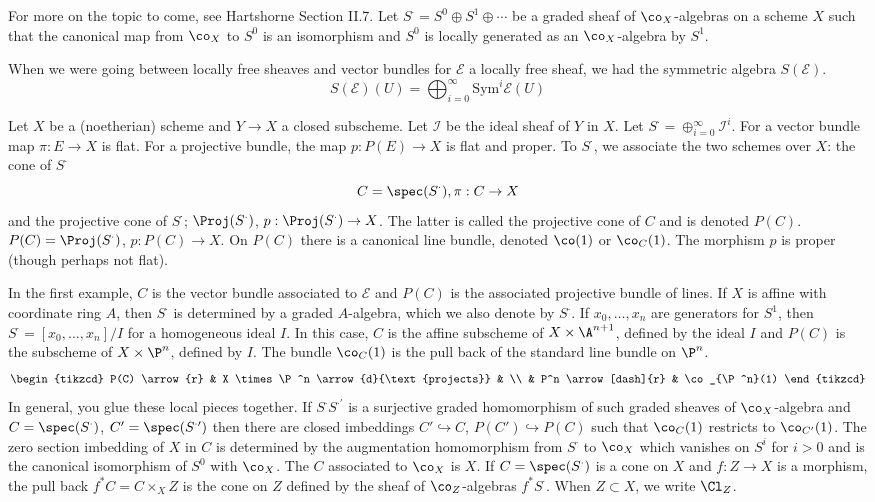 For more on the topic to come, see Hartshorne Section II.7. Let $S^\cdot=S^0 \oplus S^1 \oplus \cdots$ be a graded sheaf of $\co_X$-algebras on a scheme $X$ such that the canonical map from $\co_X$ to $S^0$ is an isomorphism and $S^0$ is locally generated as an $\co_X$-algebra by $S^1$.

\begin{ex}
When we were going between locally free sheaves and vector bundles for $\mathcal{E}$ a locally free sheaf, we had the symmetric algebra $S(\mathcal{E})$.
	\[
	S(\mathcal{E})(U)= \bigoplus_{i=0}^\infty \text{Sym}^i \mathcal{E}(U)
	\]
\end{ex}

\begin{ex}
Let $X$ be a (noetherian) scheme and $Y \to X$ a closed subscheme. Let $\mathcal{I}$ be the ideal sheaf of $Y$ in $X$. Let $S^\cdot= \oplus_{i=0}^\infty \mathcal{I}^i$. For a vector bundle map $\pi: E \to X$ is flat. For a projective bundle, the map $p: P(E) \to X$ is flat and proper. To $S^\cdot$, we associate the two schemes over $X$: the cone of $S^\cdot$
	\[
	C=\spec(S^\cdot), \pi: C \to X
	\]
and the projective cone of $S^\cdot$; $\Proj(S^\cdot)$, $p: \Proj(S^\cdot) \to X$. The latter is called the projective cone of $C$ and is denoted $P(C)$. $P(C)=\Proj(S^\cdot)$, $p: P(C) \to X$. On $P(C)$ there is a canonical line bundle, denoted $\co(1)$ or $\co_C(1)$. The morphism $p$ is proper (though perhaps not flat).
\end{ex}

In the first example, $C$ is the vector bundle associated to $\mathcal{E}$ and $P(C)$ is the associated projective bundle of lines. If $X$ is affine with coordinate ring $A$, then $S^\cdot$ is determined by a graded $A$-algebra, which we also denote by $S^\cdot$. If $x_0,\ldots,x_n$ are generators for $S^1$, then $S^\cdot= [x_0,\ldots,x_n]/I$ for a homogeneous ideal $I$. In this case, $C$ is the affine subscheme of $X \times \A^{n+1}$, defined by the ideal $I$ and $P(C)$ is the subscheme of $X \times \P^n$, defined by $I$. The bundle $\co_C(1)$ is the pull back of the standard line bundle on $\P^n$.
	\[
	\begin{tikzcd}
	P(C) \arrow{r} & X \times \P^n \arrow{d}{\text{projects}} & \\
	& P^n \arrow[dash]{r} & \co_{\P^n}(1)
	\end{tikzcd}
	\]
In general, you glue these local pieces together. If $S^\cdot S^{\cdot \prime}$ is a surjective graded homomorphism of such graded sheaves of $\co_X$-algebra and $C=\spec(S^\cdot)$, $C'=\spec(S^{\cdot\prime})$ then there are closed imbeddings $C' \hookrightarrow C$, $P(C') \hookrightarrow P(C)$ such that $\co_C(1)$ restricts to $\co_{C'}(1)$. The zero section imbedding of $X$ in $C$ is determined by the augmentation homomorphism from $S^\cdot$ to $\co_X$ which vanishes on $S^{i}$ for $i>0$ and is the canonical isomorphism of $S^0$ with $\co_X$. The $C$ associated to $\co_X$ is $X$. If $C=\spec(S^\cdot)$ is a cone on $X$ and $f: Z \to X$ is a morphism, the pull back $f^*C=C \times_X Z$ is the cone on $Z$ defined by the sheaf of $\co_Z$-algebras $f^*S^\cdot$. When $Z \subset X$, we write $\Cl_Z$. 


